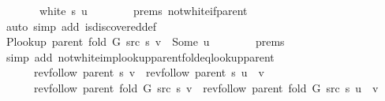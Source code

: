 \begin{isabellebody}
\ \ \ \ \ \ {\isachardoublequoteopen}{\isasymnot}\ white\ s\ u{\isachardoublequoteclose}\isanewline
\ \ \ \ \ \ \isamarkupfalse%
\ {\isachardoublequoteopen}{}{\isachardot}{\kern0pt}prems{\isachardoublequoteclose}{\isacharparenleft}{\kern0pt}{}{\isacharparenright}{\kern0pt}\ not{\isacharunderscore}{\kern0pt}white{\isacharunderscore}{\kern0pt}if{\isacharunderscore}{\kern0pt}parent\isanewline
\ \ \ \ \ \ \isamarkupfalse%
\ {\isacharparenleft}{\kern0pt}auto\ simp\ add{\isacharcolon}{\kern0pt}\ is{\isacharunderscore}{\kern0pt}discovered{\isacharunderscore}{\kern0pt}def{\isacharparenright}{\kern0pt}\isanewline
\ \ \ \ \isamarkupfalse%
\ \isamarkupfalse%
\ {\isachardoublequoteopen}P{\isacharunderscore}{\kern0pt}lookup\ {\isacharparenleft}{\kern0pt}parent\ {\isacharparenleft}{\kern0pt}fold\ G\ src\ s{\isacharparenright}{\kern0pt}{\isacharparenright}{\kern0pt}\ v\ {\isacharequal}{\kern0pt}\ Some\ u{\isachardoublequoteclose}\isanewline
\ \ \ \ \ \ \isamarkupfalse%
\ {\isachardoublequoteopen}{}{\isachardot}{\kern0pt}prems{\isachardoublequoteclose}\isanewline
\ \ \ \ \ \ \isamarkupfalse%
\ {\isacharparenleft}{\kern0pt}simp\ add{\isacharcolon}{\kern0pt}\ not{\isacharunderscore}{\kern0pt}white{\isacharunderscore}{\kern0pt}imp{\isacharunderscore}{\kern0pt}lookup{\isacharunderscore}{\kern0pt}parent{\isacharunderscore}{\kern0pt}fold{\isacharunderscore}{\kern0pt}eq{\isacharunderscore}{\kern0pt}lookup{\isacharunderscore}{\kern0pt}parent{\isacharparenright}{\kern0pt}\isanewline
\ \ \ \ \isamarkupfalse%
\ \isamarkupfalse%
\isanewline
\ \ \ \ \ \ {\isachardoublequoteopen}rev{\isacharunderscore}{\kern0pt}follow\ {\isacharparenleft}{\kern0pt}parent\ s{\isacharparenright}{\kern0pt}\ v\ {\isacharequal}{\kern0pt}\ rev{\isacharunderscore}{\kern0pt}follow\ {\isacharparenleft}{\kern0pt}parent\ s{\isacharparenright}{\kern0pt}\ u\ {\isacharat}{\kern0pt}\ {\isacharbrackleft}{\kern0pt}v{\isacharbrackright}{\kern0pt}{\isachardoublequoteclose}\isanewline
\ \ \ \ \ \ {\isachardoublequoteopen}rev{\isacharunderscore}{\kern0pt}follow\ {\isacharparenleft}{\kern0pt}parent\ {\isacharparenleft}{\kern0pt}fold\ G\ src\ s{\isacharparenright}{\kern0pt}{\isacharparenright}{\kern0pt}\ v\ {\isacharequal}{\kern0pt}\ rev{\isacharunderscore}{\kern0pt}follow\ {\isacharparenleft}{\kern0pt}parent\ {\isacharparenleft}{\kern0pt}fold\ G\ src\ s{\isacharparenright}{\kern0pt}{\isacharparenright}{\kern0pt}\ u\ {\isacharat}{\kern0pt}\ {\isacharbrackleft}{\kern0pt}v{\isacharbrackright}{\kern0pt}{\isachardoublequoteclose}\isanewline

\end{isabellebody}

